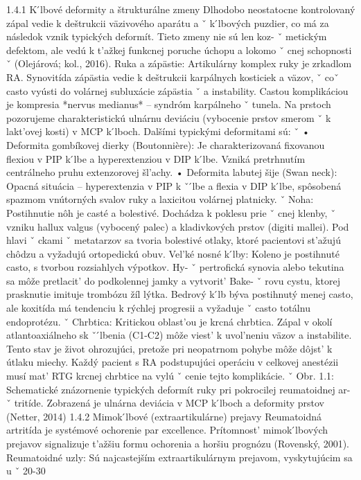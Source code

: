 { 1.4.1 K ́lbové deformity a štrukturálne zmeny Dlhodobo neostatocne kontrolovaný zápal vedie k deštrukcii väzivového aparátu a ˇ k ́lbových puzdier, co má za následok vznik typických deformít. Tieto zmeny nie sú len koz- ˇ metickým defektom, ale vedú k t’ažkej funkcnej poruche úchopu a lokomo ˇ cnej schopnosti ˇ (Olejárová; kol., 2016).
 Ruka a zápästie: Artikulárny komplex ruky je zrkadlom RA. Synovitída zápästia vedie k deštrukcii karpálnych kosticiek a väzov, ˇ coˇ casto vyústi do volárnej subluxácie zápästia ˇ a instability. Castou komplikáciou je kompresia *nervus medianus* – syndróm karpálneho ˇ tunela. Na prstoch pozorujeme charakteristickú ulnárnu deviáciu (vybocenie prstov smerom ˇ k lakt’ovej kosti) v MCP k ́lboch. Dalšími typickými deformitami sú: ˇ • Deformita gombíkovej dierky (Boutonnière): Je charakterizovaná fixovanou flexiou v PIP k ́lbe a hyperextenziou v DIP k ́lbe. Vzniká pretrhnutím centrálneho pruhu extenzorovej šl’achy.
 • Deformita labutej šije (Swan neck): Opacná situácia – hyperextenzia v PIP k ˇ  ́lbe a flexia v DIP k ́lbe, spôsobená spazmom vnútorných svalov ruky a laxicitou volárnej platnicky. ˇ Noha: Postihnutie nôh je casté a bolestivé. Dochádza k poklesu prie ˇ cnej klenby, ˇ vzniku hallux valgus (vybocený palec) a kladivkových prstov (digiti mallei). Pod hlavi ˇ ckami ˇ metatarzov sa tvoria bolestivé otlaky, ktoré pacientovi st’ažujú chôdzu a vyžadujú ortopedickú obuv.
 Vel’ké nosné k ́lby: Koleno je postihnuté casto, s tvorbou rozsiahlych výpotkov. Hy- ˇ pertrofická synovia alebo tekutina sa môže pretlacit’ do podkolennej jamky a vytvorit’ Bake- ˇ rovu cystu, ktorej prasknutie imituje trombózu žíl lýtka. Bedrový k ́lb býva postihnutý menej casto, ale koxitída má tendenciu k rýchlej progresii a vyžaduje ˇ casto totálnu endoprotézu. ˇ Chrbtica: Kritickou oblast’ou je krcná chrbtica. Zápal v okolí atlantoaxiálneho sk ˇ  ́lbenia (C1-C2) môže viest’ k uvol’neniu väzov a instabilite. Tento stav je život ohrozujúci, pretože pri neopatrnom pohybe môže dôjst’ k útlaku miechy. Každý pacient s RA podstupujúci operáciu v celkovej anestézii musí mat’ RTG krcnej chrbtice na vylú ˇ cenie tejto komplikácie. ˇ Obr. 1.1: Schematické znázornenie typických deformít ruky pri pokrocilej reumatoidnej ar- ˇ tritíde. Zobrazená je ulnárna deviácia v MCP k ́lboch a deformity prstov (Netter, 2014) 1.4.2 Mimok ́lbové (extraartikulárne) prejavy Reumatoidná artritída je systémové ochorenie par excellence. Prítomnost’ mimok ́lbových prejavov signalizuje t’ažšiu formu ochorenia a horšiu prognózu (Rovenský, 2001).
 Reumatoidné uzly: Sú najcastejším extraartikulárnym prejavom, vyskytujúcim sa u ˇ 20-30 %
}
